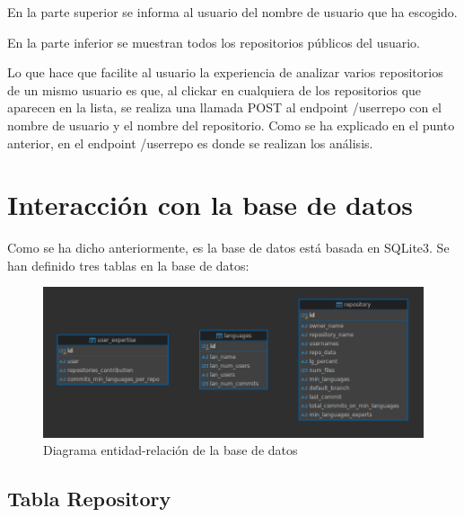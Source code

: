 \documentclass[a4paper, 12pt]{book}
\begin{document}
En la parte superior se informa al usuario del nombre de usuario que ha escogido.

En la parte inferior se muestran todos los repositorios públicos del usuario.

Lo que hace que facilite al usuario la experiencia de analizar varios repositorios de un mismo usuario es que, al clickar en cualquiera de los repositorios que aparecen en la lista, se realiza una llamada POST al endpoint /userrepo con el nombre de usuario y el nombre del repositorio. Como se ha explicado en el punto anterior, en el endpoint /userrepo es donde se realizan los análisis.

\section{Interacción con la base de datos}
\label{sec:Interacción con la base de datos}

Como se ha dicho anteriormente, es la base de datos está basada en SQLite3. Se han definido tres tablas en la base de datos:

\begin{figure}[H]
  \centering
  \includegraphics[width=1\textwidth]{img/erdiagram.png}
  \caption{Diagrama entidad-relación de la base de datos}
  \label{figura:Diagrama entidad-relación de la base de datos}
\end{figure}

\subsection{Tabla Repository}
\label{subsec:Tabla Repository}
\end{document}
